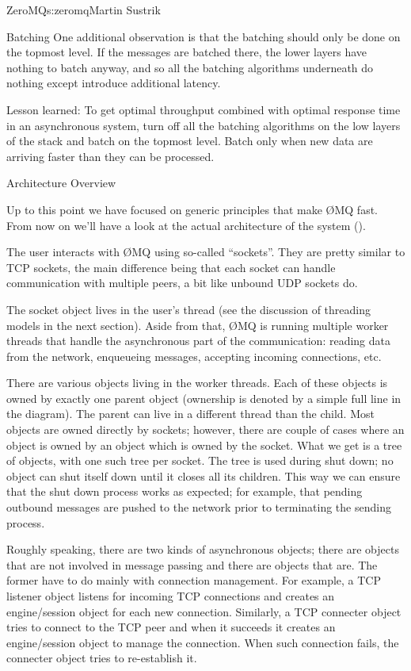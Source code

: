\begin{aosachapter}{ZeroMQ}{s:zeromq}{Martin Sustrik}
\begin{aosasect1}{Batching}
One additional observation is that the batching should only be done on
the topmost level. If the messages are batched there, the lower layers
have nothing to batch anyway, and so all the batching algorithms
underneath do nothing except introduce additional latency.

Lesson learned: To get optimal throughput combined with optimal
response time in an asynchronous system, turn off all the batching
algorithms on the low layers of the stack and batch on the topmost
level. Batch only when new data are arriving faster than they can be
processed.

\end{aosasect1}

\begin{aosasect1}{Architecture Overview}

Up to this point we have focused on generic principles that make {\O}MQ
fast. From now on we'll have a look at the actual architecture of the
system ().


The user interacts with {\O}MQ using so-called ``sockets''. They are pretty
similar to TCP sockets, the main difference being that each socket can
handle communication with multiple peers, a bit like unbound UDP
sockets do.

The socket object lives in the user's thread (see the discussion of
threading models in the next section). Aside from that, {\O}MQ is running
multiple worker threads that handle the asynchronous part of the
communication: reading data from the network, enqueueing messages,
accepting incoming connections, etc.

There are various objects living in the worker threads. Each of these
objects is owned by exactly one parent object (ownership is denoted by 
a simple full line in the
diagram). The parent can live in a
different thread than the child. Most objects are owned directly by
sockets; however, there are couple of cases where an object is owned
by an object which is owned by the socket. What we get is a tree of
objects, with one such tree per socket. The tree is used during 
shut down; no object can shut itself down until it closes all its
children. This way we can ensure that the shut down process works as
expected; for example, that pending outbound messages are pushed to
the network prior to terminating the sending process.

Roughly speaking, there are two kinds of asynchronous objects; there
are objects that are not involved in message passing and there are
objects that are.  
The former have to do mainly with connection management. For example,
a TCP listener object listens for incoming TCP connections and creates
an engine/session object for each new connection. Similarly, a TCP
connecter object tries to connect to the TCP peer and when it succeeds
it creates an engine/session object to manage the connection. When
such connection fails, the connecter object tries to re-establish it.


\end{aosasect1}
\end{aosachapter}
